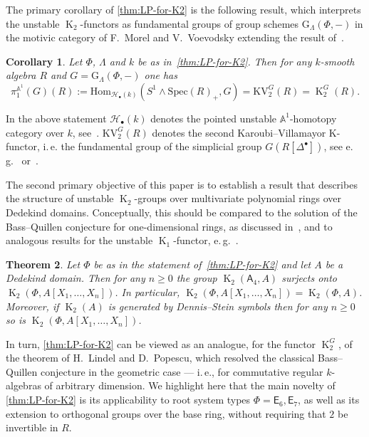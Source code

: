 \documentclass[oneside, 10pt]{amsart}
\DeclareMathOperator{\K}{K}
\newcommand{\rA}{\mathsf{A}}
\newcommand{\rE}{\mathsf{E}}
\newtheorem{thm}{Theorem}
\numberwithin{equation}{section}
\numberwithin{thm}{section}
\numberwithin{lemma}{section}
\newtheorem{cor}[thm]{Corollary}
\theoremstyle{definition}
\theoremstyle{remark}
\begin{document}
The primary corollary of \cref{thm:LP-for-K2} is the following result, which interprets the unstable $\K_2$-functors as fundamental groups of group schemes
 $\mathrm{G}_\Lambda(\Phi, -)$ in the motivic category of F.~Morel and V.~Voevodsky extending the result of~\cite[Corollary~1.2]{LSV2}.

\begin{cor} \label{cor:motivic-pi1} Let $\Phi$, $\Lambda$ and $k$ be as in~\cref{thm:LP-for-K2}.
Then for any $k$-smooth algebra $R$ and $G = \mathrm{G}_{\Lambda}(\Phi, -)$ one has
\[ \pi_1^{\mathbb{A}^1}(G)(R) := \mathrm{Hom}_{\mathscr{H}_{\bullet}(k)}(S^1 \wedge \mathrm{Spec}(R)_+, G) = \mathrm{KV}_2^{G}(R) = \K_2^G(R).\]
\end{cor}
In the above statement $\mathscr{H}_\bullet(k)$ denotes the pointed unstable $\mathbb{A}^1$-homotopy category over $k$, see~\cite{MV99}.
$\mathrm{KV}_2^{G}(R)$ denotes the second Karoubi--Villamayor K-functor, i.\,e. the fundamental group of
 the simplicial group $G(R[\Delta^\bullet])$, see e.\,g.~\cite[\S~3]{Jar83} or~\cite[\S~3.2]{LSV2}.

The second primary objective of this paper is to establish a result that describes the structure of unstable $\K_2$-groups
 over multivariate polynomial rings over Dedekind domains.
Conceptually, this should be compared to the solution of the Bass--Quillen conjecture for one-dimensional rings, as discussed in~\cite[\S~V.3]{Lam10},
 and to analogous results for the unstable $\K_1$-functor, e.\,g.~\cite[Theorem~1.1]{St-Ded}.

\begin{thm} \label{cor:dedekind}
Let $\Phi$ be as in the statement of~\cref{thm:LP-for-K2} and let $A$ be a Dedekind domain.
Then for any $n \geq 0$ the group $\K_2(\rA_4, A)$ surjects onto $\K_2(\Phi, A[X_1,\ldots, X_n])$.
In particular, $\K_2(\Phi, A[X_1,\ldots, X_n]) = \K_2(\Phi, A)$.
Moreover, if $\K_2(A)$ is generated by Dennis--Stein symbols then for any $n \geq 0$ so is $\K_2(\Phi, A[X_1,\ldots, X_n])$.
\end{thm}

In turn, \cref{thm:LP-for-K2} can be viewed as an analogue, for the functor $\K_2^G$, of the theorem of H.~Lindel and D.~Popescu,
which resolved the classical Bass--Quillen conjecture in the geometric case — i.\,e., for commutative regular $k$-algebras of arbitrary dimension.
We highlight here that the main novelty of \cref{thm:LP-for-K2} is its applicability to root system types $\Phi = \rE_6, \rE_7$,
as well as its extension to orthogonal groups over the base ring, without requiring that $2$ be invertible in $R$.
\end{document}
